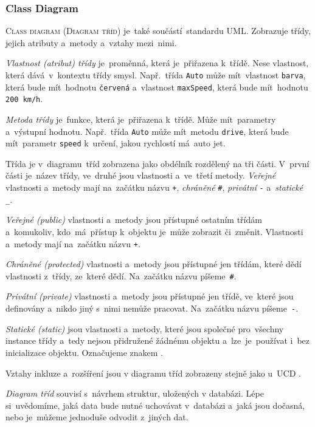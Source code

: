 \documentclass[14pt,a4paper]{article}
\begin{document}
        \subsubsection{Class Diagram}
        \textsc{Class diagram} (\textsc{Diagram tříd}) je~také součástí~standardu \textsc{UML}. Zobrazuje třídy, jejich atributy a~metody a~vztahy mezi~nimi.

        \emph{Vlastnost (atribut) třídy} je~proměnná, která je~přiřazena k~třídě. Nese vlastnost, která dává~v~kontextu třídy smysl. Např.~třída \texttt{Auto} může mít~vlastnost \texttt{barva}, která bude mít~hodnotu \texttt{červená} a~vlastnost \texttt{maxSpeed}, která bude mít~hodnotu \texttt{200 km/h}.

        \emph{Metoda třídy} je~funkce, která je~přiřazena k~třídě. Může mít~parametry a~výstupní hodnotu. Např.~třída \texttt{Auto} může mít~metodu \texttt{drive}, která bude mít~parametr \texttt{speed} k~určení, jakou rychlostí má~auto jet.
        
        Třída je v~diagramu~tříd zobrazena jako obdélník rozdělený na tři části. V~první části je~název třídy, ve~druhé jsou vlastnosti a~ve~třetí metody. \emph{Veřejné} vlastnosti a~metody mají na~začátku názvu \texttt{+}, \emph{chráněné} \texttt{\#}, \emph{privátní} \texttt{-} a~\emph{statické} \texttt{\_}.
        
        \emph{Veřejné (public)} vlastnosti a~metody jsou přístupné ostatním třídám a~komukoliv, kdo~má~přístup k~objektu je~může zobrazit či~změnit. Vlastnosti a~metody mají na~začátku názvu \texttt{+}.

        \emph{Chráněné (protected)} vlastnosti a~metody jsou přístupné jen třídám, které dědí vlastnosti z~třídy, ze~které dědí. Na~začátku názvu píšeme~\texttt{\#}.
        
        \emph{Privátní (private)} vlastnosti a~metody jsou přístupné jen třídě, ve~které jsou definovány a~nikdo jiný s~nimi nemůže pracovat. Na~začátku názvu píšeme~\texttt{-}.
        
        \emph{Statické (static)} jsou vlastnosti a~metody, které jsou společné pro~všechny instance třídy a~tedy nejsou přidružené žádnému objektu a~lze~je~používat i~bez inicializace objektu. Označujeme znakem \texttt{\textunderscore}.
        
        Vztahy inkluze a~rozšíření jsou v diagramu tříd zobrazeny stejně jako u~\textsc{UCD} \cite{visualparadigmClassDiagram}.

        \emph{Diagram tříd} souvisí s~návrhem struktur, uložených v databázi. Lépe si~uvědomíme, jaká data bude nutné uchovávat v~databázi a~jaká jsou dočasná, nebo je~můžeme jednoduše odvodit z~jiných dat.
\end{document}
